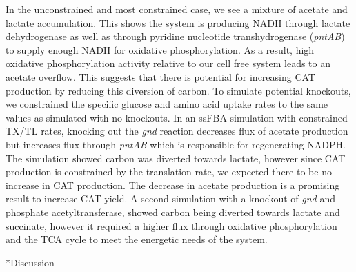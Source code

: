 \documentclass[12pt]{article}
\makeatletter
\renewcommand\section{\@startsection
	{subsection}{2}{0mm}
	{-0.2in}
	{0.05\baselineskip}
	{\normalfont\large\bfseries}}
\makeatother
\begin{document}
In the unconstrained and most constrained case, we see a mixture of acetate and lactate accumulation.
This shows the system is producing NADH through lactate dehydrogenase as well as through pyridine nucleotide transhydrogenase (\textit{pntAB}) to supply enough NADH for oxidative phosphorylation.
As a result, high oxidative phosphorylation activity relative to our cell free system leads to an acetate overflow.
This suggests that there is potential for increasing CAT production by reducing this diversion of carbon.
To simulate potential knockouts, we constrained the specific glucose and amino acid uptake rates to the same values as simulated with no knockouts.
In an ssFBA simulation with constrained TX/TL rates, knocking out the \textit{gnd} reaction decreases flux of acetate production but increases flux through \textit{pntAB} which is responsible for regenerating NADPH.
The simulation showed carbon was diverted towards lactate, however since CAT production is constrained by the translation rate, we expected there to be no increase in CAT production.
The decrease in acetate production is a promising result to increase CAT yield. 
A second simulation with a knockout of \textit{gnd} and phosphate acetyltransferase, showed carbon being diverted towards lactate and succinate, however it required a higher flux through oxidative phosphorylation and the TCA cycle to meet the energetic needs of the system.   

\clearpage

\section*{Discussion}

\end{document}
